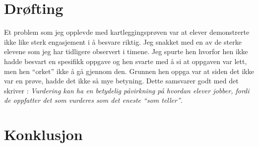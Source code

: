 \documentclass[main.tex]{subfiles}
\begin{document}
\section*{Drøfting}
\label{sec:5}


Et problem som jeg opplevde med kartleggingsprøven var at elever demonstrerte ikke like sterk engasjement
i å besvare riktig. Jeg snakket med en av de sterke elevene som jeg har tidligere observert i timene.
Jeg spurte hen hvorfor hen ikke hadde besvart en spesifikk oppgave og hen svarte med å si at oppgaven 
var lett, men hen ``orket'' ikke å gå gjennom den. Grunnen hen oppga var at siden det ikke var en prøve,
hadde det ikke så mye betyning. Dette samsvarer godt med det  skriver : \emph{Vurdering 
kan ha en betydelig påvirkning på hvordan elever jobber, fordi de oppfatter det som vurderes som det eneste
``som teller''}.

\section*{Konklusjon}
\label{sec:6}
\end{document}
